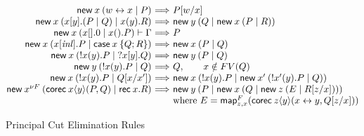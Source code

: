 \documentclass[orivec,envcountsame]{llncs}
\makeatletter
\newcommand{\cpbang}[1]{{! #1}}
\newcommand{\cptyp}[2]{#1 \vdash #2}
\newcommand{\mapname}{\mathsf{map}}
\newcommand{\map}[3]{\mapname^{#1}_{#2}(#3)}
\newcommand{\mkwd}[1]{\mathsf{#1}}
\newcommand{\link}[2]{#1 \leftrightarrow #2}
\newcommand{\cut}[4]{\mkwd{new}\:#1 \: (#3 \mid #4)}
\newcommand{\replicate}[2]{{!#1(#2)}}
\newcommand{\derelict}[2]{{?#1[#2]}}
\newcommand{\rec}[1]{\mkwd{rec}\:#1}
\newcommand{\corec}[5]{\mkwd{corec}\:#1 \langle #2 \rangle (#4,#5)}
\newcommand{\clabel}[1]{\mathit{#1}}
\renewcommand{\case}[2]{\mkwd{case}\:#1\:\{#2\}}
\newcommand{\sel}[2]{#1[\clabel{#2}]}
\newcommand{\ba}{\begin{array}}
\newcommand{\ea}{\end{array}}
\newenvironment{equations}{\[\ba{@{}r@{~}c@{~}l@{}}}{\ea\]}
\makeatother
\begin{document}
\begin{figure}[float]\small
\begin{equations}
\cut{x}{A}{\link{w}{x}}{P}
  &\Longrightarrow& P[w/x] \\
\cut{x}{A \otimes B}{x[y].(P \mid Q)}{x(y).R}
  &\Longrightarrow&
    \cut{y}{A}{Q}{\cut{x}{B}{P}{R}} \\
\cptyp{\cut{x}{1}{x[].0}{x().P}}{\Gamma}
  &\Longrightarrow&
    P \\
\cut{x}{A \oplus B}{\sel{x}{inl}.P}{\case{x}{Q;R}}
  &\Longrightarrow&
    \cut{x}{A}{P}{Q} \\
\cut{x}{\cpbang{A}}{\replicate{x}{y}.P}{\derelict{x}{y}.Q}
  &\Longrightarrow&
    \cut{y}{A}{P}{Q} \\
\cut{y}{\cpbang{A}}{\replicate{x}{y}.P}{Q}
  &\Longrightarrow&
     Q, \qquad x \notin FV(Q) \\
\cut{x}{\cpbang{A}}{\replicate{x}{y}.P}{Q[x/x']}
  &\Longrightarrow&
    \cut{x}{\cpbang{A}}{\replicate{x}{y}.P}{\cut{x'}{\cpbang{A}}{\replicate{x'}{y}.P}{Q}} \\
\cut{x^{\nu F}}{\nu F}{\corec{x}{y}{B}{P}{Q}}{\rec{x}.R}
  &\Longrightarrow&
    \cut{y}{B}{P}{\cut{x}{F(B)}{Q}{\cut{z}{F(\nu F)}{E}{R[z/x]}}} \\
&& \text{where }E = \map{F}{z,x}{\corec{z}{y}{B}{\link{x}{y}}{Q[z/x]}}
\end{equations}%
\caption{Principal Cut Elimination Rules}\label{fig:beta-reduction}
\end{figure}
\end{document}
